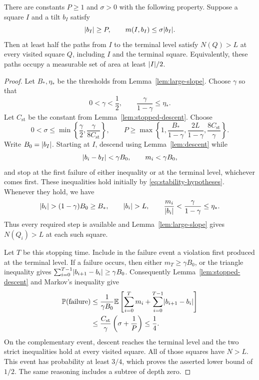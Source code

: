 \begin{proposition}\label{prop:stability}
There are constants \(P\ge1\) and \(\sigma>0\) with the following
property.  Suppose a square \(I\) and a tilt \(b_I\) satisfy
\begin{equation}\label{eq:stability-hypotheses}
 \lvert b_I\rvert\ge P,\qquad m(I,b_I)\le\sigma\lvert b_I\rvert.
\end{equation}
Then at least half the paths from \(I\) to the terminal level satisfy
\(N(Q)>L\) at every visited square \(Q\), including \(I\) and the
terminal square.  Equivalently, these paths occupy a measurable set
of area at least \(\lvert I\rvert/2\).
\end{proposition}

\begin{proof}
Let \(B_*,\eta_*\) be the thresholds from
Lemma~\ref{lem:large-slope}.  Choose \(\gamma\) so that
\[
 0<\gamma<\frac12,\qquad
 \frac{\gamma}{1-\gamma}\le\eta_*.
\]
Let \(C_{\mathrm{st}}\) be the constant from
Lemma~\ref{lem:stopped-descent}.  Choose
\[
 0<\sigma\le\min\left\{\frac{\gamma}{2},
                         \frac{\gamma}{8C_{\mathrm{st}}}\right\},
 \qquad
 P\ge\max\left\{1,\frac{B_*}{1-\gamma},
                  \frac{2L}{1-\gamma},
                  \frac{8C_{\mathrm{st}}}{\gamma}\right\}.
\]
Write \(B_0=\lvert b_I\rvert\).  Starting at \(I\), descend using
Lemma~\ref{lem:descent} while
\[
 \lvert b_i-b_I\rvert<\gamma B_0,\qquad m_i<\gamma B_0,
\]
and stop at the first failure of either inequality or at the terminal
level, whichever comes first.  These inequalities hold initially by
\eqref{eq:stability-hypotheses}.  Whenever they hold, we have
\[
 \lvert b_i\rvert>(1-\gamma)B_0\ge B_*,
 \qquad \lvert b_i\rvert>L,
 \qquad
 \frac{m_i}{\lvert b_i\rvert}
 <\frac{\gamma}{1-\gamma}\le\eta_*.
\]
Thus every required step is available and
Lemma~\ref{lem:large-slope} gives \(N(Q_i)>L\) at each such square.

Let \(T\) be this stopping time.  Include in the failure event a
violation first produced at the terminal level.
If a failure occurs, then either \(m_T\ge\gamma B_0\), or the
triangle inequality gives
\(\sum_{i=0}^{T-1}\lvert b_{i+1}-b_i\rvert\ge\gamma B_0\).
Consequently Lemma~\ref{lem:stopped-descent} and Markov's inequality
give
\[
 \begin{split}
 \mathbb P(\text{failure})
 &\le
 \frac{1}{\gamma B_0}
 \mathbb E\left[\sum_{i=0}^{T}m_i+
         \sum_{i=0}^{T-1}\lvert b_{i+1}-b_i\rvert\right]\\
 &\le\frac{C_{\mathrm{st}}}{\gamma}
                \left(\sigma+\frac1P\right)
 \le\frac14.
 \end{split}
\]
On the complementary event, descent reaches the terminal level and
the two strict inequalities hold at every visited square.
All of those squares have \(N>L\).  This event has probability at
least \(3/4\), which proves the asserted lower bound of \(1/2\).
The same reasoning includes a subtree of depth zero.
\end{proof}

